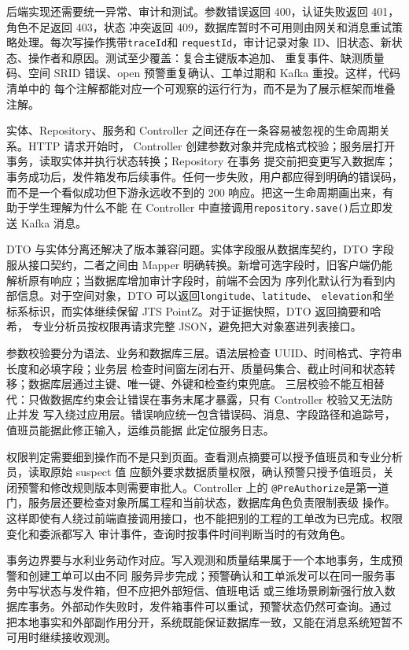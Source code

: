 后端实现还需要统一异常、审计和测试。参数错误返回 400，认证失败返回 401，角色不足返回 403，状态
冲突返回 409，数据库暂时不可用则由网关和消息重试策略处理。每次写操作携带\texttt{traceId}和
\texttt{requestId}，审计记录对象 ID、旧状态、新状态、操作者和原因。测试至少覆盖：复合主键版本追加、
重复事件、缺测质量码、空间 SRID 错误、open 预警重复确认、工单过期和 Kafka 重投。这样，代码清单中的
每个注解都能对应一个可观察的运行行为，而不是为了展示框架而堆叠注解。

实体、Repository、服务和 Controller 之间还存在一条容易被忽视的生命周期关系。HTTP 请求开始时，
Controller 创建参数对象并完成格式校验；服务层打开事务，读取实体并执行状态转换；Repository 在事务
提交前把变更写入数据库；事务成功后，发件箱发布后续事件。任何一步失败，用户都应得到明确的错误码，
而不是一个看似成功但下游永远收不到的 200 响应。把这一生命周期画出来，有助于学生理解为什么不能
在 Controller 中直接调用\texttt{repository.save()}后立即发送 Kafka 消息。

DTO 与实体分离还解决了版本兼容问题。实体字段服从数据库契约，DTO 字段服从接口契约，二者之间由
Mapper 明确转换。新增可选字段时，旧客户端仍能解析原有响应；当数据库增加审计字段时，前端不会因为
序列化默认行为看到内部信息。对于空间对象，DTO 可以返回\texttt{longitude}、\texttt{latitude}、
\texttt{elevation}和坐标系标识，而实体继续保留 JTS PointZ。对于证据快照，DTO 返回摘要和哈希，
专业分析员按权限再请求完整 JSON，避免把大对象塞进列表接口。

参数校验要分为语法、业务和数据库三层。语法层检查 UUID、时间格式、字符串长度和必填字段；业务层
检查时间窗左闭右开、质量码集合、截止时间和状态转移；数据库层通过主键、唯一键、外键和检查约束兜底。
三层校验不能互相替代：只做数据库约束会让错误在事务末尾才暴露，只有 Controller 校验又无法防止并发
写入绕过应用层。错误响应统一包含错误码、消息、字段路径和追踪号，值班员能据此修正输入，运维员能据
此定位服务日志。

权限判定需要细到操作而不是只到页面。查看测点摘要可以授予值班员和专业分析员，读取原始 suspect 值
应额外要求数据质量权限，确认预警只授予值班员，关闭预警和修改规则版本则需要审批人。Controller 上的
\texttt{@PreAuthorize}是第一道门，服务层还要检查对象所属工程和当前状态，数据库角色负责限制表级
操作。这样即使有人绕过前端直接调用接口，也不能把别的工程的工单改为已完成。权限变化和委派都写入
审计事件，查询时按事件时间判断当时的有效角色。

事务边界要与水利业务动作对应。写入观测和质量结果属于一个本地事务，生成预警和创建工单可以由不同
服务异步完成；预警确认和工单派发可以在同一服务事务中写状态与发件箱，但不应把外部短信、值班电话
或三维场景刷新强行放入数据库事务。外部动作失败时，发件箱事件可以重试，预警状态仍然可查询。通过
把本地事实和外部副作用分开，系统既能保证数据库一致，又能在消息系统短暂不可用时继续接收观测。

